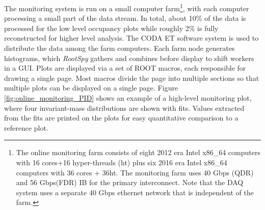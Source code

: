 The monitoring system is run on a small computer farm\footnote{The online monitoring farm consists of eight 2012 era Intel x86\_64 computers with 16 cores+16 hyper-threads (ht) plus six 2016 era Intel x86\_64 computers with 36 cores + 36ht. The monitoring farm uses 40 Gbps (QDR) and 56 Gbps(FDR) IB for the primary interconnect. Note that the DAQ system uses a separate 40 Gbps ethernet network that is independent of the farm.}, with each computer processing a small part of the data stream. In total, about 10\% of the data is processed for the low level occupancy plots while roughly 2\% is fully reconstructed for higher level analysis. The CODA ET software system is used to distribute the data among the farm computers. Each farm node generates histograms, which \textit{RootSpy} gathers and combines before display to shift workers in a GUI.
Plots are displayed via a set of ROOT \cite{Brun:1997pa} macros, each responsible for drawing a single page. Most macros divide the page into multiple sections so that multiple plots can be displayed on a single page. Figure \ref{fig:online_monitoring_PID} shows an example of a high-level monitoring plot, where four invariant-mass distributions are shown with fits. Values extracted from the fits are printed on the plots for easy quantitative comparison to a reference plot. 



